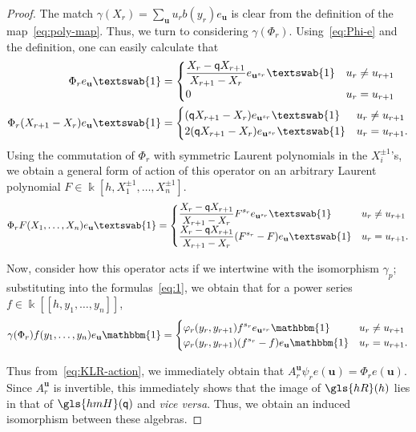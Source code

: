 \documentclass[ALCO,ThmDefs,Unicode,epreuves]{cedram}
\newcommand{\pq}{\mathsf{q}}
\newcommand{\hone}{\text{\textswab{1}}}
\newcommand{\K}{\Bbbk}%
\newcommand{\Bu}{\mathbf{u}}
\newcommand{\hmH}{\gls{hmH}}
\newcommand{\hR}{\gls{hR}}
\newcommand\llbracket{[\![}
\newcommand\rrbracket{]\!]}
\begin{document}
\begin{proof} 
The match $\gamma(X_r)=\sum_{\Bu}u_rb(y_r)e_{\Bu}$ is clear from
the definition of the map~\eqref{eq:poly-map}. Thus, we turn to considering $\gamma(\Phi_r)$.
Using~\eqref{eq:Phi-e} and the definition, one
can easily calculate that
\begin{align*}
 \Phi_r e_{\Bu} \hone&=
 \begin{cases}
 \displaystyle \frac{X_r-\pq X_{r+1}}{X_{r+1}-X_r}
 e_{\Bu^{s_r}} \hone& u_r\neq u_{r+1}\\
 0 & u_r= u_{r+1}
 \end{cases}\\
 \Phi_r (X_{r+1}-X_r) e_{\Bu}\hone&=
 \begin{cases}
 (\pq X_{r+1}-X_r) e_{\Bu^{s_r}} \hone & u_r\neq u_{r+1}\\2(\pq X_{r+1}-X_r)e_{\Bu^{s_r}} \hone& u_r= u_{r+1}.
 \end{cases}
\end{align*}
Using the commutation of $\Phi_r$ with symmetric Laurent polynomials
in the $X_i^{\pm 1}$'s, we obtain a general form of action of this
operator on an
arbitrary Laurent polynomial $F\in \K[h,X_1^{\pm 1},\dots, X_n^{\pm
 1}]$. 
\begin{equation}
\Phi_r F(X_1,\dots,X_n) e_{\Bu} \hone =
\begin{cases}
 \displaystyle \frac{X_r-\pq X_{r+1}}{X_{r+1}-X_r}F^{s_r}
 e_{\Bu^{s_r}} \hone& u_r\neq u_{r+1}\\
\displaystyle\frac{X_{r}- \pq X_{r+1}}{X_{r+1}-X_r}(F^{s_r}-F) e_{\Bu}
\hone & u_r= u_{r+1}.
\end{cases}\label{eq:1}
\end{equation}

 Now, consider how this operator acts if we intertwine with the
 isomorphism $\gamma_p$; substituting into the formulas~\eqref{eq:1},
 we obtain that for a power series $f\in \K\llbracket h,y_1,\dots, y_n\rrbracket $, 
\[\gamma(\Phi_r) f(y_1,\dots, y_n)e_{\Bu}\mathbbm{1} =\begin{cases}
 \displaystyle \varphi_r(y_r,y_{r+1})f^{s_r}
 e_{\Bu^{s_r}} \mathbbm{1}& u_r\neq u_{r+1}\\
\displaystyle \varphi_r(y_r,y_{r+1})
 ( f^{s_r}-f )e_{\Bu}\mathbbm{1}& u_r= u_{r+1}.
\end{cases}
\]


Thus from~\eqref{eq:KLR-action}, 
we immediately obtain that $A^{\Bu}_{r}\psi_r e(\Bu)=\Phi_r e(\Bu).$
Since $A^\Bu_r$ is invertible, this immediately shows that the image
of $\hR(h)$ lies in that of $\hmH(\pq)$ and \emph{vice versa}. Thus, we
obtain an induced isomorphism between these algebras.
\end{proof}
\end{document}
